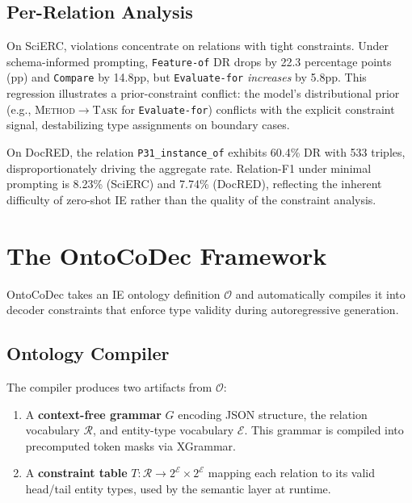 \documentclass[11pt,a4paper]{article}
\newcommand{\method}{OntoCoDec}
\begin{document}
\subsection{Per-Relation Analysis}

On SciERC, violations concentrate on relations with tight constraints. Under schema-informed prompting, \texttt{Feature-of} DR drops by 22.3 percentage points (pp) and \texttt{Compare} by 14.8pp, but \texttt{Evaluate-for} \emph{increases} by 5.8pp. This regression illustrates a prior-constraint conflict: the model's distributional prior (e.g., \textsc{Method}$\to$\textsc{Task} for \texttt{Evaluate-for}) conflicts with the explicit constraint signal, destabilizing type assignments on boundary cases.

On DocRED, the relation \texttt{P31\_instance\_of} exhibits 60.4\% DR with 533 triples, disproportionately driving the aggregate rate. Relation-F1 under minimal prompting is 8.23\% (SciERC) and 7.74\% (DocRED), reflecting the inherent difficulty of zero-shot IE rather than the quality of the constraint analysis.

\section{The \method{} Framework}
\label{sec:method}

\method{} takes an IE ontology definition $\mathcal{O}$ and automatically compiles it into decoder constraints that enforce type validity during autoregressive generation.

\subsection{Ontology Compiler}

The compiler produces two artifacts from $\mathcal{O}$:
\begin{enumerate}
    \item A \textbf{context-free grammar} $G$ encoding JSON structure, the relation vocabulary $\mathcal{R}$, and entity-type vocabulary $\mathcal{E}$. This grammar is compiled into precomputed token masks via XGrammar.
    \item A \textbf{constraint table} $T: \mathcal{R} \to 2^{\mathcal{E}} \times 2^{\mathcal{E}}$ mapping each relation to its valid head/tail entity types, used by the semantic layer at runtime.
\end{enumerate}
\end{document}
